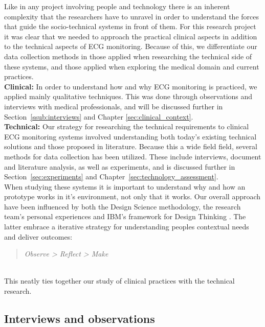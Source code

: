 Like in any project involving people and technology there is an inherent complexity that the researchers have to unravel in order to understand the forces that guide the socio-technical systems in front of them. For this research project it was clear that we needed to approach the practical clinical aspects in addition to the technical aspects of ECG monitoring. Because of this, we differentiate our data collection methods in those applied when researching the technical side of these systems, and those applied when exploring the medical domain and current practices.\\
\newline
\noindent
\textbf{Clinical:} In order to understand how and why ECG monitoring is practiced, we applied mainly qualitative techniques. This was done through observations and interviews with medical professionals, and will be discussed further in Section~\ref{ssub:interviews} and Chapter \ref{sec:clinical_context}.\\
\newline
\noindent
\textbf{Technical:} Our strategy for researching the technical requirements to clinical ECG monitoring systems involved understanding both today's existing technical solutions and those proposed in literature. Because this a wide field field, several methods for data collection has been utilized. These include interviews, document and literature analysis, as well as experiments, and is discussed further in Section~\ref{sec:experiments} and Chapter~\ref{sec:technology_assessment}.
\\
\newline
\noindent
When studying these systems it is important to understand why and how an prototype works in it's environment, not only that it works. Our overall approach have been influenced by both the Design Science methodology, the research team's personal experiences and IBM's framework for Design Thinking \cite{ibmDesignThinking}. The latter embrace a iterative strategy for understanding peoples contextual needs and deliver outcomes:

\begin{quote} 
\textit{Observe > Reflect > Make}
\end{quote}
\\
\noindent
This neatly ties together our study of clinical practices with the technical research.


\subsection{Interviews and observations} %
\label{sub:interviews}

